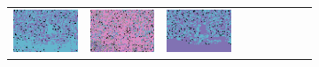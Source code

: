 \documentclass{ipol}
\begin{document}
\begin{figure}[ht]
\begin{subfigure}[t]{\linewidth}
\begin{tabular}{ccccccccc}
                \includegraphics[width=\s]{images/windmill/DCB/iso_med_64_grids.png}&
                \includegraphics[width=\s]{images/windmill/DHT/iso_med_64_grids.png}&
                \includegraphics[width=\s]{images/windmill/LINEAR/iso_med_64_grids.png}&

\end{tabular}
\end{subfigure}
\end{figure}
\end{document}
